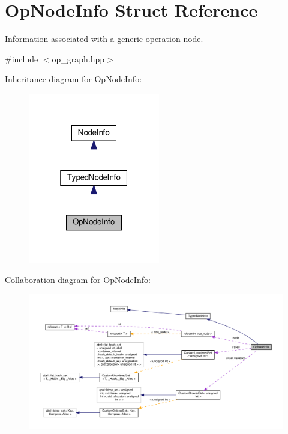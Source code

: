 \hypertarget{structOpNodeInfo}{}\section{Op\+Node\+Info Struct Reference}
\label{structOpNodeInfo}


Information associated with a generic operation node.  




{\ttfamily \#include $<$op\+\_\+graph.\+hpp$>$}



Inheritance diagram for Op\+Node\+Info\+:
\nopagebreak
\begin{figure}[H]
\begin{center}
\leavevmode
\includegraphics[width=163pt]{df/d22/structOpNodeInfo__inherit__graph}
\end{center}
\end{figure}


Collaboration diagram for Op\+Node\+Info\+:
\nopagebreak
\begin{figure}[H]
\begin{center}
\leavevmode
\includegraphics[width=350pt]{db/d05/structOpNodeInfo__coll__graph}
\end{center}
\end{figure}
